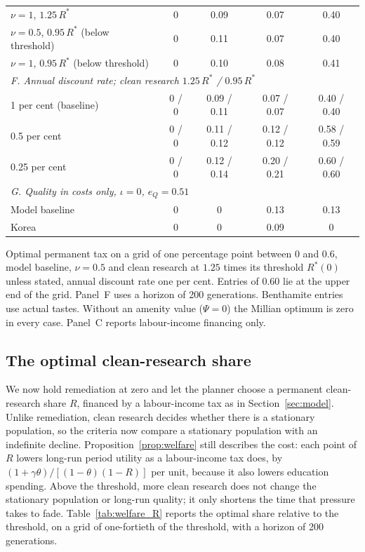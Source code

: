 \documentclass[11pt]{article}
\begin{document}
\begin{table}[h!]
\begin{threeparttable}
\begin{tabular}{lcccc}
$\nu=1$, $1.25\,R^\ast$ & 0 & 0.09 & 0.07 & 0.40\\
$\nu=0.5$, $0.95\,R^\ast$ (below threshold) & 0 & 0.11 & 0.07 & 0.40\\
$\nu=1$, $0.95\,R^\ast$ (below threshold) & 0 & 0.10 & 0.08 & 0.41\\
\midrule
\multicolumn{5}{l}{\emph{F. Annual discount rate; clean research $1.25\,R^\ast$ / $0.95\,R^\ast$}}\\
1 per cent (baseline) & 0 / 0 & 0.09 / 0.11 & 0.07 / 0.07 & 0.40 / 0.40\\
0.5 per cent & 0 / 0 & 0.11 / 0.12 & 0.12 / 0.12 & 0.58 / 0.59\\
0.25 per cent & 0 / 0 & 0.12 / 0.14 & 0.20 / 0.21 & 0.60 / 0.60\\
\midrule
\multicolumn{5}{l}{\emph{G. Quality in costs only, $\iota=0$, $e_Q=0.51$}}\\
Model baseline & 0 & 0 & 0.13 & 0.13\\
Korea & 0 & 0 & 0.09 & 0\\
\bottomrule
\end{tabular}
\begin{tablenotes}\footnotesize
\item Optimal permanent tax on a grid of one percentage point between $0$ and $0.6$, model baseline,
$\nu=0.5$ and clean research at $1.25$ times its threshold $R^\ast(0)$ unless stated, annual discount rate
one per cent. Entries of $0.60$ lie at the upper end of the grid. Panel~F uses a horizon of 200 generations. Benthamite entries use actual tastes. Without an amenity value
($\Psi=0$) the Millian optimum is zero in every case. Panel~C reports labour-income financing only. 
\end{tablenotes}
\end{threeparttable}
\end{table}

\subsection{The optimal clean-research share}
\label{sub:welfare_R}
We now hold remediation at zero and let the planner choose a permanent clean-research share $R$, financed
by a labour-income tax as in Section~\ref{sec:model}. Unlike remediation, clean research decides whether
there is a stationary population, so the criteria now compare a stationary population with an indefinite
decline. Proposition~\ref{prop:welfare} still describes the cost: each point of $R$ lowers long-run
period utility as a labour-income tax does, by $(1+\gamma\theta)/[(1-\theta)(1-R)]$ per unit, because it
also lowers education spending. Above the threshold, more clean research does not change the stationary
population or long-run quality; it only shortens the time that pressure takes to fade. Table~\ref{tab:welfare_R}
reports the optimal share relative to the threshold, on a grid of one-fortieth of the threshold, with a
horizon of 200 generations.
\end{document}
